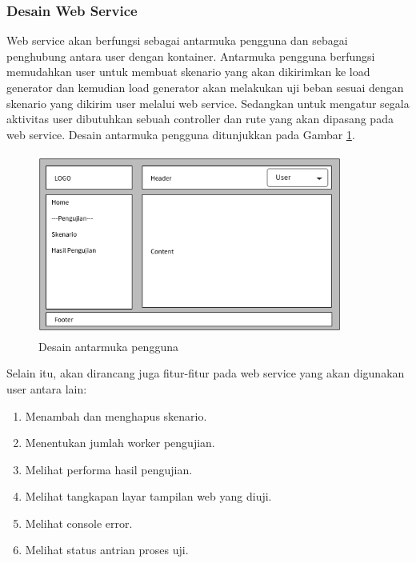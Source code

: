 	    	\subsubsection{Desain Web Service}
	    		Web service akan berfungsi sebagai antarmuka pengguna dan sebagai penghubung antara user dengan kontainer. Antarmuka pengguna berfungsi memudahkan user untuk membuat skenario yang akan dikirimkan ke load generator dan kemudian load generator akan melakukan uji beban sesuai dengan skenario yang dikirim user melalui web service. Sedangkan untuk mengatur segala aktivitas user dibutuhkan sebuah controller dan rute yang akan dipasang pada web service. Desain antarmuka pengguna ditunjukkan pada Gambar \ref{mockupweb}.
	    		\begin{figure}[H]
	    			\centering
	    			\includegraphics[width=10cm,height=6cm]{Images/C-3/mockupweb.png}
	    			\caption{Desain antarmuka pengguna}
	    			\label{mockupweb}
	    		\end{figure}
	    	
		    	Selain itu, akan dirancang juga fitur-fitur pada web service yang akan digunakan user antara lain:
		    	\begin{enumerate}
		    		\item Menambah dan menghapus skenario.
		    		\item Menentukan jumlah worker pengujian.
		    		\item Melihat performa hasil pengujian.
		    		\item Melihat tangkapan layar tampilan web yang diuji.
		    		\item Melihat console error.
		    		\item Melihat status antrian proses uji. \\
		    	\end{enumerate}
	    		
